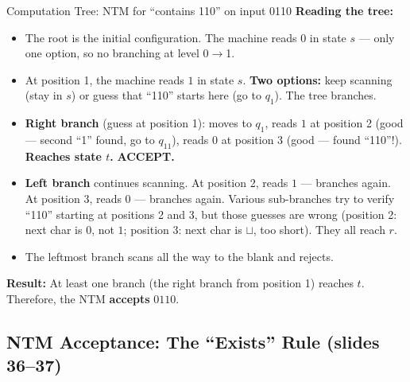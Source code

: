 \begin{examplebox}{Computation Tree: NTM for ``contains 110'' on input 0110}
\textbf{Reading the tree:}
\begin{itemize}[nosep]
\item The root is the initial configuration. The machine reads $0$ in state $s$
  --- only one option, so no branching at level 0$\to$1.
\item At position 1, the machine reads $1$ in state $s$. \textbf{Two options:}
  keep scanning (stay in $s$) or guess that ``110'' starts here (go to $q_1$).
  The tree branches.
\item \textbf{Right branch} (guess at position 1): moves to $q_1$, reads $1$ at
  position 2 (good --- second ``1'' found, go to $q_{11}$), reads $0$ at
  position 3 (good --- found ``110''!). \textbf{Reaches state $t$.}
  \textcolor{green!60!black}{\textbf{ACCEPT.}}
\item \textbf{Left branch} continues scanning. At position 2, reads $1$ ---
  branches again. At position 3, reads $0$ --- branches again. Various
  sub-branches try to verify ``110'' starting at positions 2 and 3, but those
  guesses are wrong (position 2: next char is $0$, not $1$; position 3: next
  char is $\sqcup$, too short). They all reach $r$.
\item The leftmost branch scans all the way to the blank and rejects.
\end{itemize}

\textbf{Result:} At least one branch (the right branch from position 1) reaches
$t$. Therefore, the NTM \textbf{accepts} $0110$.

\end{examplebox}

\subsection{NTM Acceptance: The ``Exists'' Rule (slides 36--37)}
\label{subsec:ntm-acceptance}

